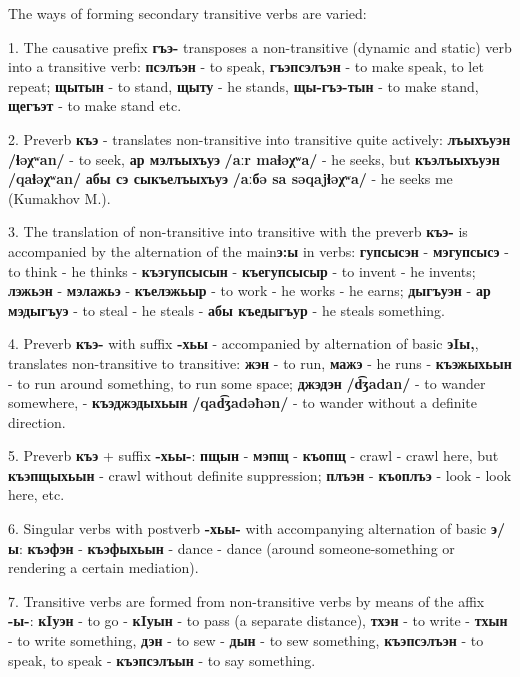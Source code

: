 \documentclass[a4paper,12pt]{book}
\newcommand{\1}[1]{\textbf{\emph{#1}}} %
\newcommand{\2}[1]{\textbf{[#1]}} %
\newcommand{\3}[1]{\fontsize{11pt}{0cm}\textbf{\emph{#1}}} %
\newcommand{\4}[1]{\fontsize{10pt}{0cm}\emph{#1}}	%
\newcommand{\5}[1]{\textbf{/#1/}} %
\newcommand{\6}[1]{\textbf{[#1]}} %
\newcommand{\7}[1]{\fontsize{12pt}{0cm}\emph{#1}} %
\newcommand{\8}[1]{\fontsize{12pt}{0cm}`#1'} %
\newcommand{\9}[1]{\fontsize{12pt}{0cm}(lit. `#1')} %
\newcommand{\glossphonemics}[1]{\textbf{/#1/}} %
\begin{document}
The ways of forming secondary transitive verbs are varied:

1. The causative prefix \textbf{гъэ-} transposes a non-transitive (dynamic and static) verb into a transitive verb: \textbf{псэлъэн} - to speak, \textbf{гъэпсэлъэн} - to make speak, to let repeat; \textbf{щытын} - to stand, \textbf{щыту} - he stands, \textbf{щы-гъэ-тын} - to make stand, \textbf{щегъэт} - to make stand etc.

2. Preverb \textbf{къэ} - translates non-transitive into transitive quite actively: \textbf{лъыхъуэн} \glossphonemics{ɬəχʷan} - to seek, \textbf{ар мэлъыхъуэ} \glossphonemics{aːr maɬəχʷa} - he seeks, but \textbf{къэлъыхъуэн} \glossphonemics{qaɬəχʷan} \textbf{абы сэ сыкъелъыхъуэ} \glossphonemics{aːбə sa səqajɬəχʷa} - he seeks me (Kumakhov M.).

3. The translation of non-transitive into transitive with the preverb \textbf{къэ-} is accompanied by the alternation of the main\textbf{э:ы} in verbs: \textbf{гупсысэн} - \textbf{мэгупсысэ} - to think - he thinks - \textbf{къэгупсысын} - \textbf{къегупсысыр} - to invent - he invents; \textbf{лэжьэн} - \textbf{мэлажьэ} - \textbf{къелэжьыр} - to work - he works - he earns; \textbf{дыгъуэн} - \textbf{ар мэдыгъуэ} - to steal - he steals - \textbf{абы къедыгъур} - he steals something.

4. Preverb \textbf{къэ-} with suffix \textbf{-хьы} - accompanied by alternation of basic \textbf{эIы,}, translates non-transitive to transitive: \textbf{жэн} - to run, \textbf{мажэ} - he runs - \textbf{къэжыхьын} - to run around something, to run some space; \textbf{джэдэн} \glossphonemics{d͡ʒadan} - to wander somewhere, - \textbf{къэджэдыхьын} \glossphonemics{qad͡ʒadəħən} - to wander without a definite direction.

5. Preverb \textbf{къэ} + suffix \textbf{-хьы-}: \textbf{пщын} - \textbf{мэпщ} - \textbf{къопщ} - crawl - crawl here, but \textbf{къэпщыхьын} - crawl without definite suppression; \textbf{плъэн} - \textbf{къоплъэ} - look - look here, etc.

6. Singular verbs with postverb \textbf{-хьы-} with accompanying alternation of basic \textbf{э/ы}: \textbf{къэфэн} - \textbf{къэфыхьын} - dance - dance (around someone-something or rendering a certain mediation).

7. Transitive verbs are formed from non-transitive verbs by means of the affix \textbf{-ы-}: \textbf{кIуэн} - to go - \textbf{кIуын} - to pass (a separate distance), \textbf{тхэн} - to write - \textbf{тхын} - to write something, \textbf{дэн} - to sew - \textbf{дын} - to sew something, \textbf{къэпсэлъэн} - to speak, to speak - \textbf{къэпсэлъын} - to say something.
\end{document}

